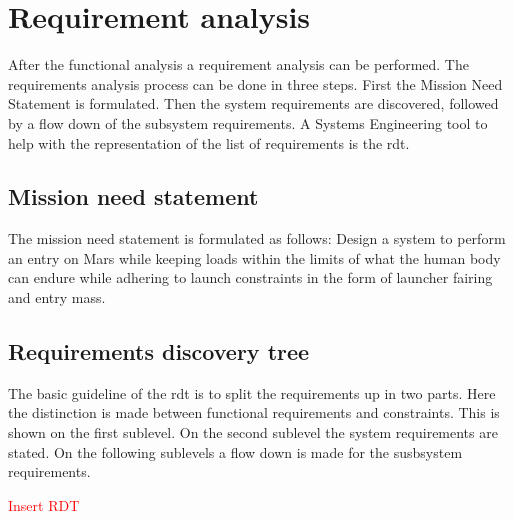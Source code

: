 \section{Requirement analysis}\label{ch:req}
After the functional analysis a requirement analysis can be performed. The requirements analysis process can be done in three steps. First the Mission Need Statement is formulated. Then the system requirements are discovered, followed by a flow down of the subsystem requirements. A Systems Engineering tool to help with the representation of the list of requirements is the \gls{rdt}.

\subsection{Mission need statement}
The mission need statement is formulated as follows:  Design a system to perform an entry on Mars while keeping loads within the limits of what the human body can endure while adhering to launch constraints in the form of launcher fairing and entry mass. \cite{Balasooriyan2015}

\subsection{Requirements discovery tree}
The basic guideline of the \gls{rdt} is to split the requirements up in two parts. Here the distinction is made between functional requirements and constraints. This is shown on the first sublevel. On the second sublevel the system requirements are stated. On the following sublevels a flow down is made for the susbsystem requirements.

\textcolor{red}{Insert RDT}